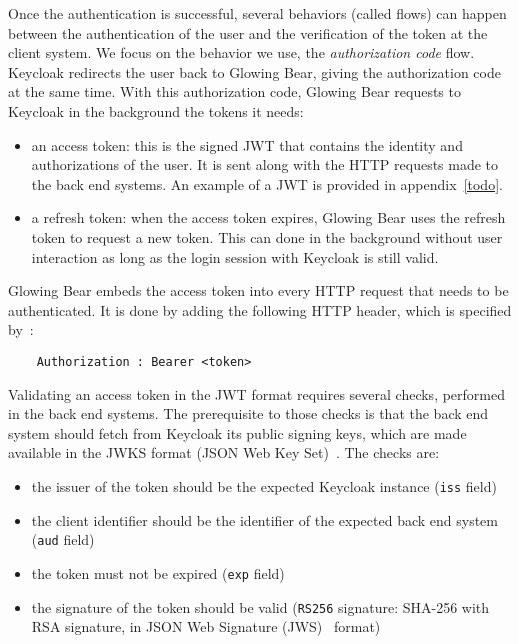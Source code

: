 Once the authentication is successful, several behaviors (called flows) can happen between the authentication of the user and the verification of the token at the client system.
We focus on the behavior we use, the \emph{authorization code} flow.
Keycloak redirects the user back to Glowing Bear, giving the authorization code at the same time.
With this authorization code, Glowing Bear requests to Keycloak in the background the tokens it needs:

\begin{itemize}
    \item an access token: this is the signed JWT that contains the identity and authorizations of the user. It is sent along with the HTTP requests made to the back end systems. An example of a JWT is provided in appendix~\ref{todo}.
    \item a refresh token: when the access token expires, Glowing Bear uses the refresh token to request a new token. This can done in the background without user interaction as long as the login session with Keycloak is still valid.
\end{itemize}

Glowing Bear embeds the access token into every HTTP request that needs to be authenticated.
It is done by adding the following HTTP header, which is specified by~\cite{todo rfc}:
\begin{verbatim}
    Authorization : Bearer <token>
\end{verbatim}

Validating an access token in the JWT format requires several checks, performed in the back end systems.
The prerequisite to those checks is that the back end system should fetch from Keycloak its public signing keys, which are made available in the JWKS format (JSON Web Key Set)~\cite{todo}.
The checks are:

\begin{itemize}
    \item the issuer of the token should be the expected Keycloak instance (\verb|iss| field)
    \item the client identifier should be the identifier of the expected back end system (\verb|aud| field)
    \item the token must not be expired (\verb|exp| field)
    \item the signature of the token should be valid (\verb|RS256| signature: SHA-256 with RSA signature, in JSON Web Signature (JWS)~\cite{todo} format)
\end{itemize}

